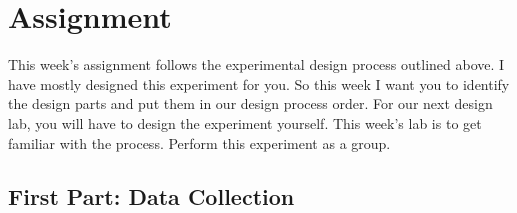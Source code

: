\documentclass{book}
\begin{document}
\section{Assignment}

This week's assignment follows the experimental design process outlined above.
I have mostly designed this experiment for you. So this week I want you to
identify the design parts and put them in our design process order. For our
next design lab, you will have to design the experiment yourself. This week's
lab is to get familiar with the process. Perform this experiment as a group.

\subsection{First Part: Data Collection}
\end{document}
